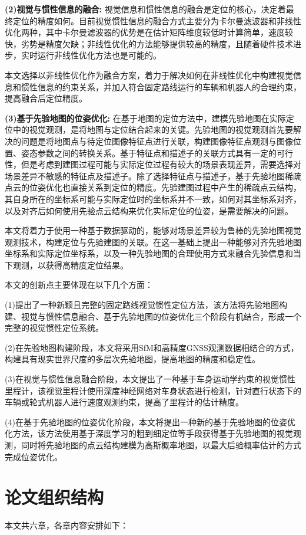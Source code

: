 \textbf{(2)视觉与惯性信息的融合:}
视觉信息和惯性信息的融合是定位的核心，决定着最终定位的精度如何。目前视觉惯性信息的融合方式主要分为卡尔曼滤波器和非线性优化两种，其中卡尔曼滤波器的优势是在估计矩阵维度较低时计算简单，速度较快，劣势是精度欠缺；非线性优化的方法能够提供较高的精度，且随着硬件技术进步，实时运行非线性优化方法也是可能的。

本文选择以非线性优化作为融合方案，着力于解决如何在非线性优化中构建视觉信息和惯性信息的约束关系，并加入符合固定路线运行的车辆和机器人的合理约束，提高融合后定位精度。

\textbf{(3)基于先验地图的位姿优化:}
在基于地图的定位方法中，建模先验地图在实际定位中的视觉观测，是将地图与定位结合起来的关键。先验地图的视觉观测首先要解决的问题是将地图点与待定位图像特征点进行关联，构建图像特征点观测与图像位置、姿态参数之间的转换关系。基于特征点和描述子的关联方式具有一定的可行性，但是考虑到建图过程可能与实际定位过程有较大的场景表现差异，需要选择对场景差异不敏感的特征点及描述子。除了选择特征点与描述子，基于先验地图稀疏点云的位姿优化也直接关系到定位的精度。先验建图过程中产生的稀疏点云结构，其自身所在的坐标系可能与实际定位时的坐标系并不一致，如何对其坐标系对齐，以及对齐后如何使用先验点云结构来优化实际定位的位姿，是需要解决的问题。

本文将着力于使用一种基于数据驱动的，能够对场景差异较为鲁棒的先验地图视觉观测技术，构建定位与先验建图的关联。在这一基础上提出一种能够对齐先验地图坐标系和实际定位坐标系，以及一种先验地图的合理使用方式来融合先验信息和当下观测，以获得高精度定位结果。

本文的创新点主要体现在以下几个方面：

(1)提出了一种新颖且完整的固定路线视觉惯性定位方法，该方法将先验地图构建、视觉与惯性信息融合、基于先验地图的位姿优化三个阶段有机结合，形成一个完整的视觉惯性定位系统。

(2)在先验地图构建阶段，本文将采用SfM和高精度GNSS观测数据相结合的方式，构建具有现实世界尺度的多层次先验地图，提高地图的精度和稳定性。

(3)在视觉与惯性信息融合阶段，本文提出了一种基于车身运动学约束的视觉惯性里程计，该视觉里程计使用深度神经网络对车身状态进行检测，针对直行状态下的车辆或轮式机器人进行速度观测约束，提高了里程计的估计精度。

(4)在基于先验地图的位姿优化阶段，本文将提出一种新的基于先验地图的位姿优化方法，该方法使用基于深度学习的粗到细定位等手段获得基于先验地图的视觉观测，同时将先验地图的点云结构建模为高斯概率地图，以最大后验概率估计的方式完成位姿优化。

\section{论文组织结构}
本文共六章，各章内容安排如下：

